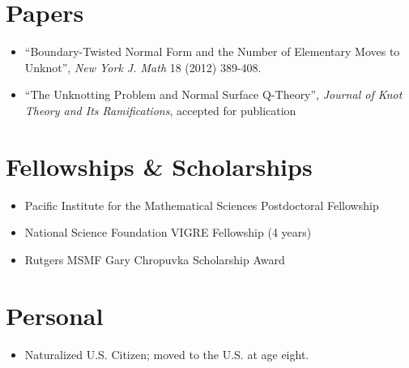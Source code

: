 \documentclass[margin]{res}
\def\tightlist{}
\begin{document}
\begin{resume}
\section{Papers}\label{papers}

\begin{itemize}
\tightlist
\item
  ``Boundary-Twisted Normal Form and the Number of Elementary Moves to
  Unknot'', \emph{New York J. Math} 18 (2012) 389-408.
\item
  ``The Unknotting Problem and Normal Surface Q-Theory'', \emph{Journal
  of Knot Theory and Its Ramifications}, accepted for publication
\end{itemize}

\section{Fellowships \& Scholarships}\label{fellowships-scholarships}

\begin{itemize}
\tightlist
\item
  Pacific Institute for the Mathematical Sciences Postdoctoral
  Fellowship
\item
  National Science Foundation VIGRE Fellowship (4 years)
\item
  Rutgers MSMF Gary Chropuvka Scholarship Award
\end{itemize}

\section{Personal}\label{personal}

\begin{itemize}
\tightlist
\item
  Naturalized U.S. Citizen; moved to the U.S. at age eight.
\end{itemize}

\end{resume}
\end{document}
